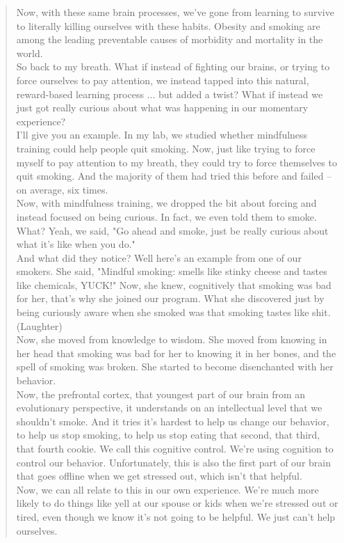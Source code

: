 \documentclass[a4paper,dottedtoc,headinclude,footinclude]{report} %
\theoremstyle{plain}
\begin{document}
\begin{quote}
    Now, with these same brain processes, we've gone from learning to survive to literally killing ourselves with these habits. Obesity and smoking are among the leading preventable causes of morbidity and mortality in the world.\\
    So back to my breath. What if instead of fighting our brains, or trying to force ourselves to pay attention, we instead tapped into this natural, reward-based learning process ... but added a twist? What if instead we just got really curious about what was happening in our momentary experience?\\
    I'll give you an example. In my lab, we studied whether mindfulness training could help people quit smoking. Now, just like trying to force myself to pay attention to my breath, they could try to force themselves to quit smoking. And the majority of them had tried this before and failed -- on average, six times.\\
    Now, with mindfulness training, we dropped the bit about forcing and instead focused on being curious. In fact, we even told them to smoke. What? Yeah, we said, "Go ahead and smoke, just be really curious about what it's like when you do."\\
    And what did they notice? Well here's an example from one of our smokers. She said, "Mindful smoking: smells like stinky cheese and tastes like chemicals, YUCK!" Now, she knew, cognitively that smoking was bad for her, that's why she joined our program. What she discovered just by being curiously aware when she smoked was that smoking tastes like shit.\\
    (Laughter)\\
    Now, she moved from knowledge to wisdom. She moved from knowing in her head that smoking was bad for her to knowing it in her bones, and the spell of smoking was broken. She started to become disenchanted with her behavior.\\
    Now, the prefrontal cortex, that youngest part of our brain from an evolutionary perspective, it understands on an intellectual level that we shouldn't smoke. And it tries it's hardest to help us change our behavior, to help us stop smoking, to help us stop eating that second, that third, that fourth cookie. We call this cognitive control. We're using cognition to control our behavior. Unfortunately, this is also the first part of our brain that goes offline when we get stressed out, which isn't that helpful.\\
    Now, we can all relate to this in our own experience. We're much more likely to do things like yell at our spouse or kids when we're stressed out or tired, even though we know it's not going to be helpful. We just can't help ourselves.\\

\end{quote}
\end{document}

